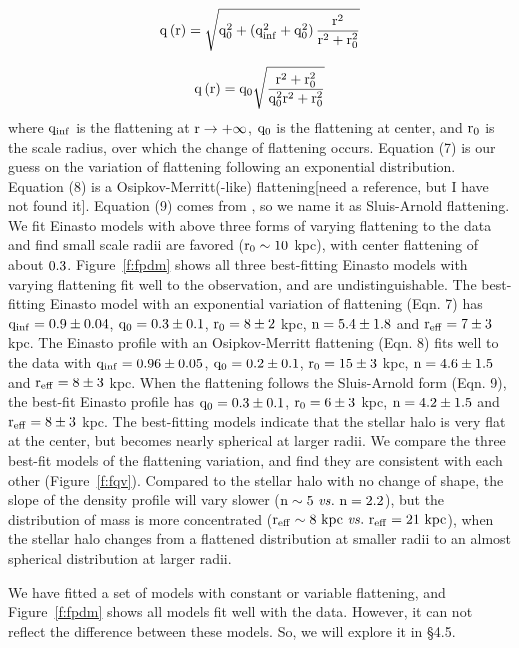 \documentclass[12pt,preprint]{aastex}
\begin{document}
\begin{equation}
\rm q\left(r\right)=\sqrt{q_0^2+\left(q_{inf}^2+q_0^2\right)\frac{r^2}{r^2+r_0^2}}
\end{equation}

\begin{equation}
\rm q\left(r\right)=q_0\sqrt{\frac{r^2+r_0^2}{q_0^2r^2+r_0^2}}
\end{equation}
where $\rm q_{inf}$ is the flattening at $\rm r\rightarrow+\infty$, $\rm q_0$ is the flattening at center, and $\rm r_0$ is the scale radius, over which the change of flattening occurs. Equation (7) is our guess on the variation of flattening following an exponential distribution. Equation (8) is a Osipkov-Merritt(-like) flattening[need a reference, but I have not found it]. Equation (9) comes from \citet{Sluis1998}, so we name it as Sluis-Arnold flattening. We fit Einasto models with above three forms of varying flattening to the data and find small scale radii are favored ($\rm r_0 \sim 10~$kpc), with center flattening of about $\rm 0.3$. Figure~\ref{f:fpdm} shows all three best-fitting Einasto models with varying flattening fit well to the observation, and are undistinguishable. The best-fitting Einasto model with an exponential variation of flattening (Eqn. 7) has $\rm q_{inf}=0.9\pm0.04$, $\rm q_0=0.3\pm0.1$, $\rm r_0=8\pm2~$kpc, $\rm n=5.4\pm1.8$ and $\rm r_{eff}=7\pm3~$kpc. The Einasto profile with an Osipkov-Merritt flattening (Eqn. 8) fits well to the data with $\rm q_{inf}=0.96\pm0.05$, $\rm q_0=0.2\pm0.1$, $\rm r_0=15\pm3~$kpc, $\rm n=4.6\pm1.5$ and $\rm r_{eff}=8\pm3~$kpc. When the flattening follows the Sluis-Arnold form (Eqn. 9), the best-fit Einasto profile has $\rm q_0=0.3\pm0.1$, $\rm r_0=6\pm3~$kpc, $\rm n=4.2\pm1.5$ and $\rm r_{eff}=8\pm3~$kpc. The best-fitting models indicate that the stellar halo is very flat at the center, but becomes nearly spherical at larger radii. We compare the three best-fit models of the flattening variation, and find they are consistent with each other (Figure~\ref{f:fqv}). Compared to the stellar halo with no change of shape, the slope of the density profile will vary slower ($\rm n\sim5~ \it{vs.} \rm ~n=2.2$), but the distribution of mass is more concentrated ($\rm r_{eff}\sim8~kpc~ \it{vs.}~ \rm r_{eff}=21~kpc$), when the stellar halo changes from a flattened distribution at smaller radii to an almost spherical distribution at larger radii.

We have fitted a set of models with constant or variable flattening, and Figure~\ref{f:fpdm} shows all models fit well with the data. However, it can not reflect the difference between these models. So, we will explore it in \S 4.5. 
      
\end{document}
